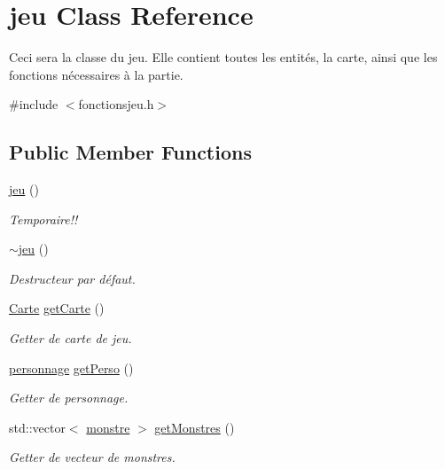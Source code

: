 \hypertarget{classjeu}{}\section{jeu Class Reference}
\label{classjeu}


Ceci sera la classe du jeu. Elle contient toutes les entités, la carte, ainsi que les fonctions nécessaires à la partie.  




{\ttfamily \#include $<$fonctionsjeu.\+h$>$}

\subsection*{Public Member Functions}
\begin{DoxyCompactItemize}
\item 
\hyperlink{classjeu_a38513a7bfd0a7ea4e3a5612da2856016}{jeu} ()
\begin{DoxyCompactList}\small\item\em Temporaire!! \end{DoxyCompactList}\item 
\hyperlink{classjeu_a55385a33ef40e0579eb3a3634566c4a8}{$\sim$jeu} ()
\begin{DoxyCompactList}\small\item\em Destructeur par défaut. \end{DoxyCompactList}\item 
\hyperlink{class_carte}{Carte} \hyperlink{classjeu_ae2e46e1fdeb23fc643ed506b0df7f21f}{get\+Carte} ()
\begin{DoxyCompactList}\small\item\em Getter de carte de jeu. \end{DoxyCompactList}\item 
\hyperlink{classpersonnage}{personnage} \hyperlink{classjeu_a8bd58d1469db0d7595bb732403036823}{get\+Perso} ()
\begin{DoxyCompactList}\small\item\em Getter de personnage. \end{DoxyCompactList}\item 
std\+::vector$<$ \hyperlink{classmonstre}{monstre} $>$ \hyperlink{classjeu_a22e7a7e7b932b935fa73658820038176}{get\+Monstres} ()
\begin{DoxyCompactList}\small\item\em Getter de vecteur de monstres. \end{DoxyCompactList}\item 

\end{DoxyCompactItemize}
